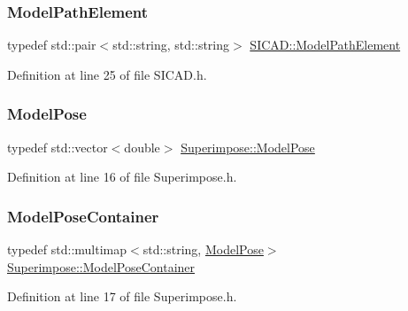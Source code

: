 \subsubsection{\texorpdfstring{Model\+Path\+Element}{ModelPathElement}}
{\footnotesize\ttfamily typedef std\+::pair$<$std\+::string, std\+::string$>$ \mbox{\hyperlink{classSICAD_a5148c8a96c82625706ce2e5b86b52dd7}{S\+I\+C\+A\+D\+::\+Model\+Path\+Element}}}



Definition at line 25 of file S\+I\+C\+A\+D.\+h.

\mbox{\label{classSuperimpose_a85d40a5caf19f486d1e0c15c0a025378}} 
\subsubsection{\texorpdfstring{Model\+Pose}{ModelPose}}
{\footnotesize\ttfamily typedef std\+::vector$<$double$>$ \mbox{\hyperlink{classSuperimpose_a85d40a5caf19f486d1e0c15c0a025378}{Superimpose\+::\+Model\+Pose}}\hspace{0.3cm}{\ttfamily [inherited]}}



Definition at line 16 of file Superimpose.\+h.

\mbox{\label{classSuperimpose_a178e3d4e2def6635bfcf9454dd4b5d22}} 
\subsubsection{\texorpdfstring{Model\+Pose\+Container}{ModelPoseContainer}}
{\footnotesize\ttfamily typedef std\+::multimap$<$std\+::string, \mbox{\hyperlink{classSuperimpose_a85d40a5caf19f486d1e0c15c0a025378}{Model\+Pose}}$>$ \mbox{\hyperlink{classSuperimpose_a178e3d4e2def6635bfcf9454dd4b5d22}{Superimpose\+::\+Model\+Pose\+Container}}\hspace{0.3cm}{\ttfamily [inherited]}}



Definition at line 17 of file Superimpose.\+h.

\mbox{\label{classSuperimpose_a1e02e0225687b42296dcfee4eadf8a55}} 
